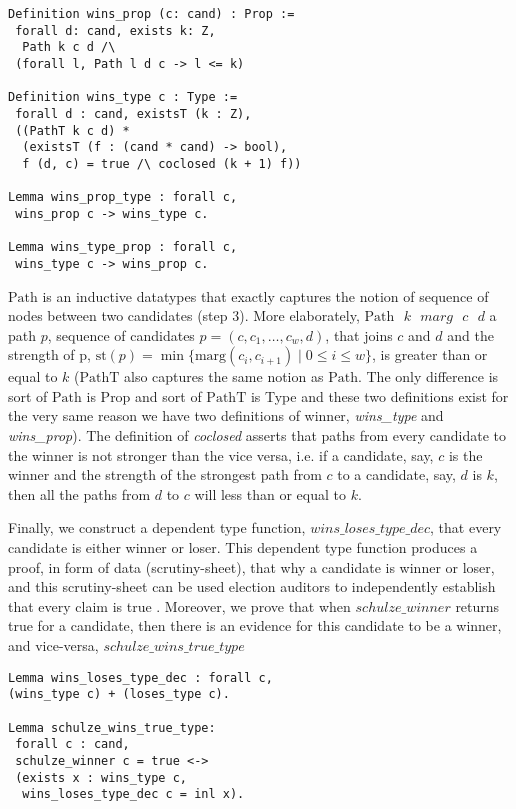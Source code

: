 \documentclass[compsoc,conference,a4paper,10pt,times]{IEEEtran}
\begin{document}
	  
\begin{verbatim}
Definition wins_prop (c: cand) : Prop := 
 forall d: cand, exists k: Z,
  Path k c d /\ 
 (forall l, Path l d c -> l <= k)
	 
Definition wins_type c : Type :=
 forall d : cand, existsT (k : Z),
 ((PathT k c d) *
  (existsT (f : (cand * cand) -> bool), 
  f (d, c) = true /\ coclosed (k + 1) f))
  
Lemma wins_prop_type : forall c, 
 wins_prop c -> wins_type c.
   
Lemma wins_type_prop : forall c, 
 wins_type c -> wins_prop c.    
\end{verbatim}

\noindent
$\mathrm{Path}$ is an inductive datatypes that exactly captures the notion of 
sequence of nodes between two candidates (step 3). 
More elaborately, 
$\mathrm{Path} \text{ }k \text{ }marg \text{ }c \text{ }d$ a path $p$, sequence of candidates 
$p= (c,c_{1}, \dots ,c_{w},d)$, that joins $c$ and $d$ and the strength of 
p, $\mathrm{st}(p) =  \min \lbrace \mathrm{marg} (c_i, c_{i+1}) \mid 0 
\leq i \leq w \rbrace$, is greater than or equal to $k$ ($\mathrm{PathT}$ also captures 
the same notion as $\mathrm{Path}$. The only difference is sort of $\mathrm{Path}$ is Prop 
and sort of $\mathrm{PathT}$ is Type and these two definitions exist for the very same reason 
we have two definitions of winner,  \textit{wins\_type} and \textit{wins\_prop}).
The definition of \textit{coclosed} asserts that
paths from every candidate to the winner 
is not stronger than the vice versa, i.e.
if a candidate, say, $c$ is the winner and the strength 
of the strongest path from $c$ to a candidate,  say, $d$ is $k$, 
then all the paths from $d$ to $c$ will less than or equal to $k$.

\noindent
Finally, we construct a dependent type function, $wins\_loses\_type\_dec$, 
that every candidate is either winner or loser. This dependent type 
function produces a proof, in form of 
data (scrutiny-sheet), that why a candidate is winner or loser, and this 
scrutiny-sheet can be used election auditors to independently establish 
that every claim is true \cite{Arkoudas:2005:DRC}. Moreover,
we prove that when $schulze\_winner$ returns true for a candidate, then
there is an evidence for this candidate to be a winner, and vice-versa, 
$schulze\_wins\_true\_type$

\begin{verbatim}
Lemma wins_loses_type_dec : forall c, 
(wins_type c) + (loses_type c).

Lemma schulze_wins_true_type: 
 forall c : cand, 
 schulze_winner c = true <-> 
 (exists x : wins_type c, 
  wins_loses_type_dec c = inl x).


\end{verbatim}
\end{document}
